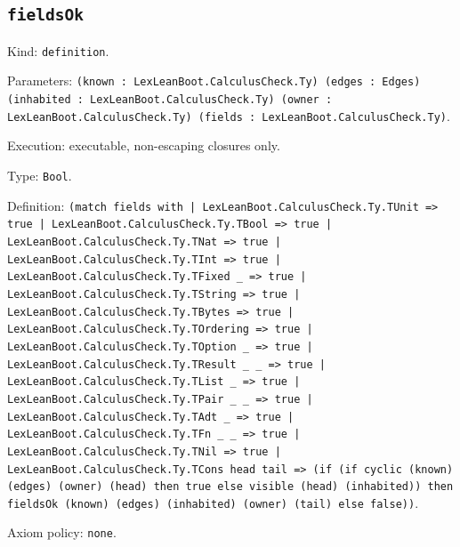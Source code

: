 \documentclass[11pt]{article}
\begin{document}
\subsection*{\texttt{fieldsOk}}
\noindent Kind: \texttt{definition}.\par
\noindent Parameters: \texttt{(known : LexLeanBoot.CalculusCheck.Ty) (edges : Edges) (inhabited : LexLeanBoot.CalculusCheck.Ty) (owner : LexLeanBoot.CalculusCheck.Ty) (fields : LexLeanBoot.CalculusCheck.Ty)}.\par
\noindent Execution: executable, non-escaping closures only.\par
\noindent Type: \texttt{Bool}.\par
\noindent Definition: \texttt{(match fields with | LexLeanBoot.CalculusCheck.Ty.TUnit => true | LexLeanBoot.CalculusCheck.Ty.TBool => true | LexLeanBoot.CalculusCheck.Ty.TNat => true | LexLeanBoot.CalculusCheck.Ty.TInt => true | LexLeanBoot.CalculusCheck.Ty.TFixed \_ => true | LexLeanBoot.CalculusCheck.Ty.TString => true | LexLeanBoot.CalculusCheck.Ty.TBytes => true | LexLeanBoot.CalculusCheck.Ty.TOrdering => true | LexLeanBoot.CalculusCheck.Ty.TOption \_ => true | LexLeanBoot.CalculusCheck.Ty.TResult \_ \_ => true | LexLeanBoot.CalculusCheck.Ty.TList \_ => true | LexLeanBoot.CalculusCheck.Ty.TPair \_ \_ => true | LexLeanBoot.CalculusCheck.Ty.TAdt \_ => true | LexLeanBoot.CalculusCheck.Ty.TFn \_ \_ => true | LexLeanBoot.CalculusCheck.Ty.TNil => true | LexLeanBoot.CalculusCheck.Ty.TCons head tail => (if (if cyclic (known) (edges) (owner) (head) then true else visible (head) (inhabited)) then fieldsOk (known) (edges) (inhabited) (owner) (tail) else false))}.\par
\noindent Axiom policy: \texttt{none}.\par
\end{document}
